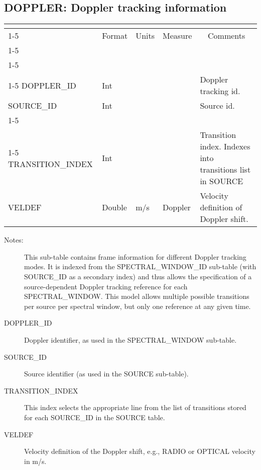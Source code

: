 \documentclass{article}
\newcommand{\defline}[1]{\cline{1-5}
\multicolumn{5}{|l|}{#1} \\
\cline{1-5}}
\newcommand{\definetable}[3][]
{
  \vfill\newpage
  \subsection{#2}
  \label{tbl:#1}
  \vspace{0.15in}
  \small
  \begin{tabular}{|l|p{1.25in}|l|p{.9in}|p{1.4in}|}
  \hline
  \multicolumn{5}{|c|}{\bf #1}\\
  \cline{1-5}
  \multicolumn{1}{|c|}{Name}&\multicolumn{1}{|c|}{Format}&
  \multicolumn{1}{|c|}{Units}&\multicolumn{1}{|c|}{Measure}&
  \multicolumn{1}{|c|}{Comments}\\
  \cline{1-5}
  #3
  \hline
  \end{tabular}
}
\begin{document}
\definetable{DOPPLER: Doppler tracking information}{
\defline{\bf Columns}
\defline{\em Key}
DOPPLER\_ID  & Int & & & Doppler tracking id.\\
SOURCE\_ID  & Int & & & Source id.\\
\defline{\em Data}
TRANSITION\_INDEX & Int & & & Transition index. Indexes into transitions list in SOURCE\\
VELDEF & Double & m/s & Doppler & Velocity definition of Doppler shift.\\
}
\begin{description}

\item[Notes:] This sub-table contains frame information
for different Doppler tracking modes. It is indexed from the
SPECTRAL\_WINDOW\_ID sub-table (with SOURCE\_ID as a secondary index)
and thus allows the specification of a source-dependent Doppler
tracking reference for each SPECTRAL\_WINDOW. This model allows
multiple possible transitions per source per spectral window, but only
one reference at any given time.

\item[DOPPLER\_ID] Doppler identifier, as used in the SPECTRAL\_WINDOW
sub-table.

\item[SOURCE\_ID] Source identifier (as used in the SOURCE sub-table).

\item[TRANSITION\_INDEX] This index selects the appropriate line from the
list of transitions stored for each SOURCE\_ID in the SOURCE table.

\item[VELDEF] Velocity definition of the Doppler shift, e.g., RADIO or
OPTICAL velocity in m/s.

\end{description}
\end{document}
